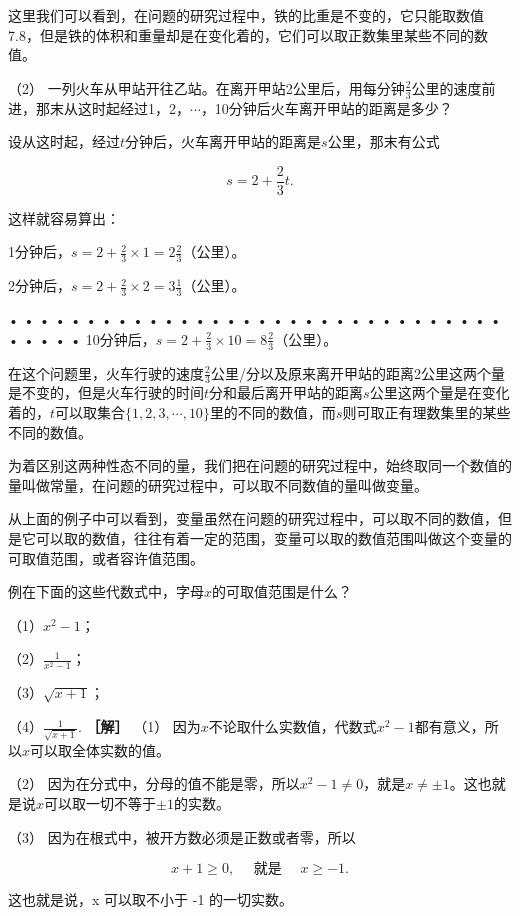 这里我们可以看到，在问题的研究过程中，铁的比重是不变的，它只能取数值7.8，但是铁的体积和重量却是在变化着的，它们可以取正数集里某些不同的数值。

（2）
一列火车从甲站开往乙站。在离开甲站2公里后，用每分钟\(\frac{2}{3}\)公里的速度前进，那末从这时起经过1，2，\(\cdots\)，10分钟后火车离开甲站的距离是多少？

设从这时起，经过\(t\)分钟后，火车离开甲站的距离是\(s\)公里，那末有公式

\[
s = 2 + \frac{2}{3} t.
\]

这样就容易算出：

1分钟后，\(s = 2 + \frac{2}{3}\times 1 = 2\frac{2}{3}\)（公里）。

2分钟后，\(s = 2 + \frac{2}{3}\times 2 = 3\frac{1}{3}\)（公里）。

• • • • • • • • • • • • • • • • • • • • • • • • • • • • • • • • • • • •
• 10分钟后，\(s = 2 + \frac{2}{3}\times 10 = 8\frac{2}{3}\)（公里）。

在这个问题里，火车行驶的速度\(\frac{2}{3}\)公里/分以及原来离开甲站的距离2公里这两个量是不变的，但是火车行驶的时间\(t\)分和最后离开甲站的距离\(s\)公里这两个量是在变化着的，\(t\)可以取集合\(\{1, 2, 3, \cdots, 10\}\)里的不同的数值，而\(s\)则可取正有理数集里的某些不同的数值。

为着区别这两种性态不同的量，我们把在问题的研究过程中，始终取同一个数值的量叫做常量，在问题的研究过程中，可以取不同数值的量叫做变量。

从上面的例子中可以看到，变量虽然在问题的研究过程中，可以取不同的数值，但是它可以取的数值，往往有着一定的范围，变量可以取的数值范围叫做这个变量的可取值范围，或者容许值范围。

例在下面的这些代数式中，字母\(x\)的可取值范围是什么？

（1）\(x^{2} - 1\)；

（2）\(\frac{1}{x^2 - 1}\)；

（3）\(\sqrt{x + 1}\)；

（4）\(\frac{1}{\sqrt{x + 1}}.\) \textbf{［解］} （1）
因为\(x\)不论取什么实数值，代数式\(x^{2} - 1\)都有意义，所以\(x\)可以取全体实数的值。

（2）
因为在分式中，分母的值不能是零，所以\(x^{2} - 1 \neq 0\)，就是\(x \neq \pm 1\)。这也就是说\(x\)可以取一切不等于\(\pm 1\)的实数。

（3） 因为在根式中，被开方数必须是正数或者零，所以

\[
x + 1 \geqslant 0, \quad \text{ 就是 } \quad x \geqslant - 1.
\]

这也就是说，x 可以取不小于 -1 的一切实数。

